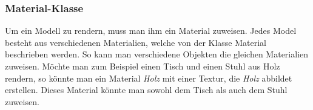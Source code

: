 \subsubsection{Material-Klasse}
Um ein Modell zu rendern, muss man ihm ein Material zuweisen. Jedes Model besteht aus verschiedenen Materialien, welche von der Klasse Material beschrieben werden.
So kann man verschiedene Objekten die gleichen Materialien zuweisen. Möchte man zum Beispiel einen Tisch und einen Stuhl aus Holz rendern, so könnte man ein Material \textit{Holz} mit einer Textur, die \textit{Holz} abbildet erstellen. Dieses Material könnte man sowohl dem Tisch als auch dem Stuhl zuweisen.





